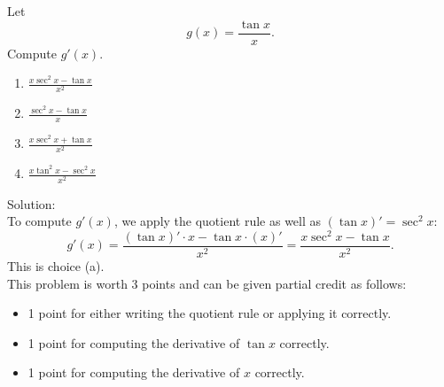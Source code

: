 \documentclass[12pt]{article}
\newenvironment{problem}[2][Problem]{\begin{trivlist}
\item[\hskip \labelsep {\bfseries #1}\hskip \labelsep {\bfseries #2.}]}
{\end{trivlist}}
\begin{document}
\begin{problem}{2}
Let
\[
  g(x) = \frac{\tan x}{x}.
\]
Compute $g'(x)$.

\begin{enumerate}
  \item $\displaystyle \frac{x\sec^2 x -\tan x}{x^2}$
  \item $\displaystyle \frac{\sec^2 x -\tan x}{x}$
  \item $\displaystyle \frac{x\sec^2 x +\tan x}{x^2}$
  \item $\displaystyle \frac{x\tan^2 x -\sec^2 x}{x^2}$
\end{enumerate}
Solution:\\
To compute $g'(x)$, we apply the quotient rule as well as $(\tan x)' = \sec^2 x$:
\[
  g'(x) = \frac{(\tan x)'\cdot x - \tan x\cdot (x)'}{x^2}
  = \frac{x\sec^2 x - \tan x}{x^2}.
\]
This is choice (a).\\
This problem is worth 3 points and can be given partial credit as follows:
\begin{itemize}
  \item 1 point for either writing the quotient rule or applying it correctly.
  \item 1 point for computing the derivative of $\tan x$ correctly.
  \item 1 point for computing the derivative of $x$ correctly.
\end{itemize}
\end{problem}

\pagebreak
\end{document}
